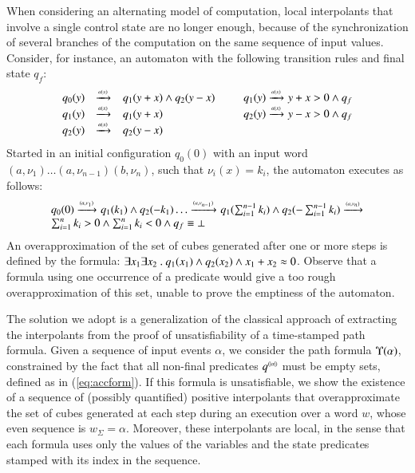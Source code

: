 \documentclass{llncs}
\begin{document}
When considering an alternating model of computation, local
interpolants that involve a single control state are no longer enough,
because of the synchronization of several branches of the computation
on the same sequence of input values. Consider, for instance, an
automaton with the following transition rules and final state $q_f$:
\[\begin{array}{rclcrcl}
q_0(y) & \xrightarrow{{\scriptscriptstyle a(x)}}_{{\scriptstyle }} & q_1(y+x) \wedge q_2(y-x) & \hspace*{2mm} & 
q_1(y) \xrightarrow{{\scriptscriptstyle a(x)}}_{{\scriptstyle }} y+x > 0 \wedge q_f \\
q_1(y) & \xrightarrow{{\scriptscriptstyle a(x)}}_{{\scriptstyle }} & q_1(y+x) && q_2(y) \xrightarrow{{\scriptscriptstyle a(x)}}_{{\scriptstyle }} y-x > 0 \wedge q_f \\
q_2(y) & \xrightarrow{{\scriptscriptstyle a(x)}}_{{\scriptstyle }} & q_2(y-x)
\end{array}\]
Started in an initial configuration $q_0(0)$ with an input word
$(a,\nu_1) \ldots (a,\nu_{n-1}) (b,\nu_n)$, such that $\nu_i(x)=k_i$,
the automaton executes as follows:
\[\begin{array}{l}
q_0(0) \xrightarrow{{\scriptscriptstyle (a,\nu_1)}}_{{\scriptstyle }} q_1(k_1)
\wedge q_2(-k_1) \ldots \xrightarrow{{\scriptscriptstyle (a,\nu_{n-1})}}_{{\scriptstyle }} 
q_1(\sum_{i=1}^{n-1} k_i) \wedge q_2(-\sum_{i=1}^{n-1} k_i) \xrightarrow{{\scriptscriptstyle (a,\nu_n)}}_{{\scriptstyle }} \\
\sum_{i=1}^{n} k_i > 0 \wedge \sum_{i=1}^{n} k_i < 0 \wedge q_f \equiv \bot
\end{array}\] 
An overapproximation of the set of cubes generated after one or more
steps is defined by the formula: $\exists x_1 \exists x_2 ~.~ q_1(x_1)
\wedge q_2(x_2) \wedge x_1+x_2 \approx 0$. Observe that a formula using
one occurrence of a predicate would give a too rough overapproximation
of this set, unable to prove the emptiness of the automaton.

The solution we adopt is a generalization of the classical approach of
extracting the interpolants from the proof of unsatisfiability of a
time-stamped path formula. Given a sequence of input events $\alpha$,
we consider the path formula $\Upsilon({\alpha})$, constrained by the
fact that all non-final predicates ${q}^{\scriptscriptstyle{({{|{\alpha}|}})}}$ must be
empty sets, defined as in (\ref{eq:accform}). If this formula is
unsatisfiable, we show the existence of a sequence of (possibly
quantified) positive interpolants that overapproximate the set of
cubes generated at each step during an execution over a word $w$,
whose even sequence is $w_\Sigma = \alpha$. Moreover, these
interpolants are local, in the sense that each formula uses only the
values of the variables and the state predicates stamped with its
index in the sequence.
\end{document}
